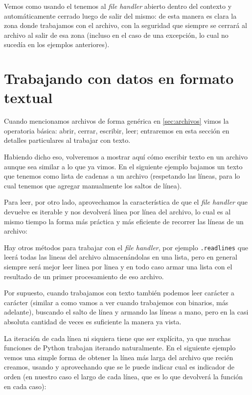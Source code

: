 Vemos como usando el  tenemos al \textit{file handler} abierto dentro del contexto y automáticamente cerrado luego de salir del mismo: de esta manera es clara la zona donde trabajamos con el archivo, con la seguridad que siempre se cerrará al archivo al salir de esa zona (incluso en el caso de una excepción, lo cual no sucedía en los ejemplos anteriores).


\section{Trabajando con datos en formato textual}

Cuando mencionamos archivos de forma genérica en \ref{sec:archivos} vimos la operatoria básica: abrir, cerrar, escribir, leer; entraremos en esta sección en detalles particulares al trabajar con texto.

Habiendo dicho eso, volveremos a mostrar aquí cómo escribir texto en un archivo aunque sea similar a lo que ya vimos. En el siguiente ejemplo bajamos un texto que tenemos como lista de cadenas a un archivo (respetando las líneas, para lo cual tenemos que agregar manualmente los saltos de línea).


Para leer, por otro lado, aprovechamos la característica de que el \textit{file handler} que devuelve  es iterable y nos devolverá línea por línea del archivo, lo cual es al mismo tiempo la forma más práctica y más eficiente de recorrer las líneas de un archivo:


Hay otros métodos para trabajar con el \textit{file handler}, por ejemplo \texttt{.readlines} que leerá todas las lineas del archivo almacenándolas en una lista, pero en general siempre será mejor leer linea por linea y en todo caso armar una lista con el resultado de un primer procesamiento de eso archivo.

Por supuesto, cuando trabajamos con texto también podemos leer carácter a carácter (similar a como vamos a ver cuando trabajemos con binarios, más adelante), buscando el salto de línea y armando las líneas a mano, pero en la casi absoluta cantidad de veces es suficiente la manera ya vista.

La iteración de cada línea ni siquiera tiene que ser explícita, ya que muchas funciones de Python trabajan iterando naturalmente. En el siguiente ejemplo vemos una simple forma de obtener la línea más larga del archivo que recién creamos, usando  y aprovechando que se le puede indicar cual es indicador de orden (en nuestro caso el largo de cada línea, que es lo que devolverá la función  en cada caso):

